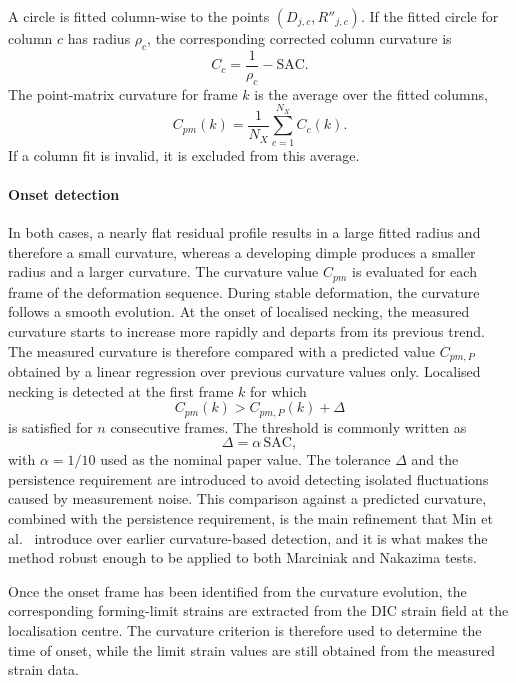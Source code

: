 A circle is fitted column-wise to the points $(D_{j,c},R''_{j,c})$. If the
fitted circle for column $c$ has radius $\rho_c$, the corresponding corrected
column curvature is
\begin{equation}
    C_c = \frac{1}{\rho_c} - \mathrm{SAC}.
    \label{eq:ms_column_curvature}
\end{equation}
The point-matrix curvature for frame $k$ is the average over the fitted
columns,
\begin{equation}
    C_{pm}(k) = \frac{1}{N_X}\sum_{c=1}^{N_X} C_c(k).
    \label{eq:ms_cpm_corrected}
\end{equation}
If a column fit is invalid, it is excluded from this average.

\paragraph{Onset detection}
In both cases, a nearly flat residual profile results in a large fitted radius
and therefore a small curvature, whereas a developing dimple produces a smaller
radius and a larger curvature. The curvature value $C_{pm}$ is evaluated for
each frame of the deformation sequence. During stable deformation, the curvature
follows a smooth evolution. At the onset of localised necking, the measured
curvature starts to increase
more rapidly and departs from its previous trend. The measured curvature is
therefore compared with a predicted value $C_{pm,P}$ obtained by a linear
regression over previous curvature values only. Localised necking is detected
at the first frame $k$ for which
\begin{equation}
    C_{pm}(k) > C_{pm,P}(k) + \Delta
    \label{eq:ms_onset}
\end{equation}
is satisfied for $n$ consecutive frames. The threshold is commonly written as
\begin{equation}
    \Delta = \alpha\,\mathrm{SAC},
    \label{eq:ms_delta}
\end{equation}
with $\alpha=1/10$ used as the nominal paper value. The tolerance $\Delta$ and
the persistence requirement are introduced to avoid detecting isolated
fluctuations caused by measurement noise. This comparison against a predicted
curvature, combined with the persistence requirement, is the main refinement
that Min et al.~\cite{Min2017} introduce over earlier curvature-based
detection, and it is what makes the method robust enough to be applied to both
Marciniak and Nakazima tests.

Once the onset frame has been identified from the curvature evolution, the
corresponding forming-limit strains are extracted from the DIC strain field at
the localisation centre. The curvature criterion is therefore used to determine
the time of onset, while the limit strain values are still obtained from the
measured strain data.

